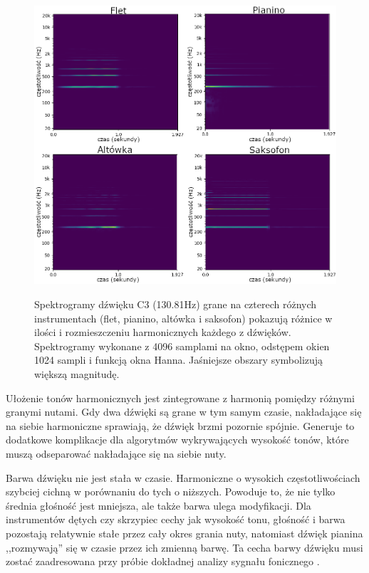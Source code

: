 \documentclass[12pt,a4paper,twoside]{mwart}
\begin{document}
\begin{figure}[t]
  \begin{center}
  \includegraphics[scale=0.4]{images/spectogram_instruments.png}\\
  \caption{Spektrogramy dźwięku C3 (130.81Hz) grane na czterech różnych instrumentach (flet, pianino, altówka i saksofon) pokazują różnice w ilości i rozmieszczeniu harmonicznych każdego z dźwięków. Spektrogramy wykonane z 4096 samplami na okno, odstępem okien 1024 sampli i funkcją okna Hanna. Jaśniejsze obszary symbolizują większą magnitudę.}
  \label{fig:spektrogram}
  \end{center}
\end{figure}

Ułożenie tonów harmonicznych jest zintegrowane z harmonią pomiędzy różnymi granymi nutami. Gdy dwa dźwięki są grane w tym samym czasie, nakładające się na siebie harmoniczne sprawiają, że dźwięk brzmi pozornie spójnie. Generuje to dodatkowe komplikacje dla algorytmów wykrywających wysokość tonów, które muszą odseparować nakładające się na siebie nuty.

Barwa dźwięku nie jest stała w czasie. Harmoniczne o wysokich częstotliwościach szybciej cichną w porównaniu do tych o niższych. Powoduje to, że nie tylko średnia głośność jest mniejsza, ale także barwa ulega modyfikacji. Dla instrumentów dętych czy skrzypiec cechy jak wysokość tonu, głośność i barwa pozostają relatywnie stałe przez cały okres grania nuty, natomiast dźwięk pianina ,,rozmywają'' się w czasie przez ich zmienną barwę. Ta cecha barwy dźwięku musi zostać zaadresowana przy próbie dokładnej analizy sygnału fonicznego 
\cite[64-65]{Homerecording:DlaKazdego}
 \cite[804–805]{Transcription:Klapuri:MultipleFundamentalFrequencyEstimation}
 .
\end{document}
